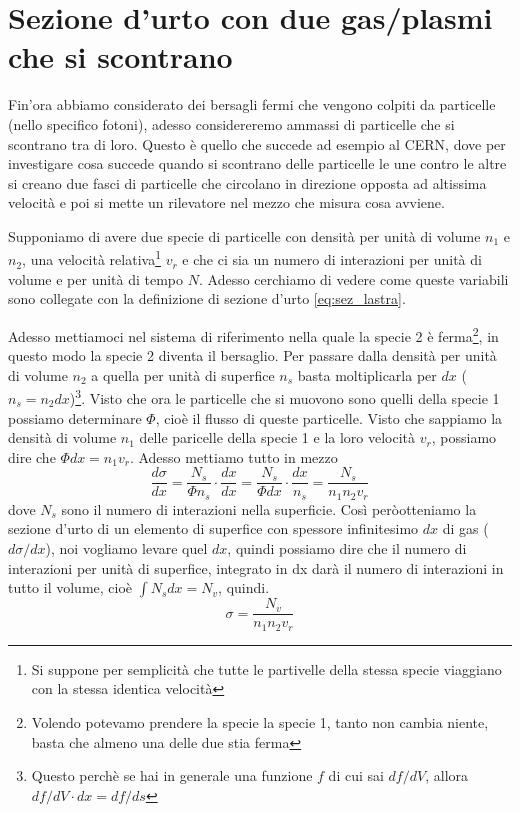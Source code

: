 \documentclass[11pt,a4paper]{article}
\begin{document}
	\section{Sezione d'urto con due gas/plasmi che si scontrano}
		\label{sec:gas}
		Fin'ora abbiamo considerato dei bersagli fermi che vengono colpiti da particelle (nello specifico fotoni), adesso considereremo ammassi di particelle che si scontrano tra di loro.\newline
		Questo è quello che succede ad esempio al CERN, dove per investigare cosa succede quando si scontrano delle particelle le une contro le altre si creano due fasci di particelle che circolano in direzione opposta ad altissima velocità e poi si mette un rilevatore nel mezzo che misura cosa avviene.\newline

		Supponiamo di avere due specie di particelle con densità per unità di volume $n_1$ e $n_2$, una velocità relativa\footnote{Si suppone per semplicità che tutte le partivelle della stessa specie viaggiano con la stessa identica velocità} $v_r$ e che ci sia un numero di interazioni per unità di volume e per unità di tempo $N$.\newline
		Adesso cerchiamo di vedere come queste variabili sono collegate con la definizione di sezione d'urto \ref{eq:sez_lastra}.\newline

		Adesso mettiamoci nel sistema di riferimento nella quale la specie 2 è ferma\footnote{Volendo potevamo prendere la specie la specie 1, tanto non cambia niente, basta che almeno una delle due stia ferma}, in questo modo la specie 2 diventa il bersaglio.\newline
		Per passare dalla densità per unità di volume $n_2$ a quella per unità di superfice $n_s$ basta moltiplicarla per $dx$ ($n_s=n_2dx$)\footnote{Questo perchè se hai in generale una funzione $f$ di cui sai $df/dV$, allora $df/dV\cdot dx=df/ds$}.\newline
		Visto che ora le particelle che si muovono sono quelli della specie 1 possiamo determinare $\Phi$, cioè il flusso di queste particelle. Visto che sappiamo la densità di volume $n_1$ delle paricelle della specie 1 e la loro velocità $v_r$, possiamo dire che $\Phi dx=n_1v_r$. Adesso mettiamo tutto in mezzo\newline
		\[
			\frac{d\sigma}{dx}=\frac{N_s}{\Phi n_s}\cdot\frac{dx}{dx}=\frac{N_s}{\Phi dx}\cdot\frac{dx}{n_s}=\frac{N_s}{n_1n_2v_r}
		\]
		dove $N_s$ sono il numero di interazioni nella superficie.\newline
		Così  peròotteniamo la sezione d'urto di un elemento di superfice con spessore infinitesimo $dx$ di gas ($d\sigma/dx$), noi vogliamo levare quel $dx$, quindi possiamo dire che il numero di interazioni per unità di superfice, integrato in dx darà il numero di interazioni in tutto il volume, cioè $\int N_sdx=N_v$, quindi.
		\begin{equation}
			\sigma=\frac{N_v}{n_1n_2v_r}
			\label{eq:gas}
		\end{equation} 
\end{document}
